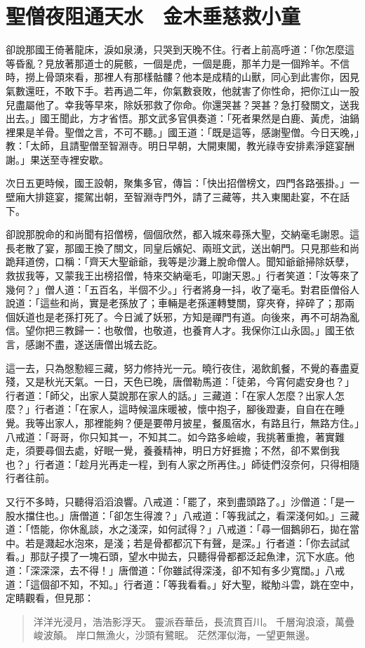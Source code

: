 
\chapter{聖僧夜阻通天水　金木垂慈救小童}

卻說那國王倚著龍床，淚如泉湧，只哭到天晚不住。行者上前高呼道：「你怎麼這等昏亂？見放著那道士的屍骸，一個是虎，一個是鹿，那羊力是一個羚羊。不信時，撈上骨頭來看，那裡人有那樣骷髏？他本是成精的山獸，同心到此害你，因見氣數還旺，不敢下手。若再過二年，你氣數衰敗，他就害了你性命，把你江山一股兒盡屬他了。幸我等早來，除妖邪救了你命。你還哭甚？哭甚？急打發關文，送我出去。」國王聞此，方才省悟。那文武多官俱奏道：「死者果然是白鹿、黃虎，油鍋裡果是羊骨。聖僧之言，不可不聽。」國王道：「既是這等，感謝聖僧。今日天晚，」教：「太師，且請聖僧至智淵寺。明日早朝，大開東閣，教光祿寺安排素淨筵宴酬謝。」果送至寺裡安歇。

次日五更時候，國王設朝，聚集多官，傳旨：「快出招僧榜文，四門各路張掛。」一壁廂大排筵宴，擺駕出朝，至智淵寺門外，請了三藏等，共入東閣赴宴，不在話下。

卻說那脫命的和尚聞有招僧榜，個個欣然，都入城來尋孫大聖，交納毫毛謝恩。這長老散了宴，那國王換了關文，同皇后嬪妃、兩班文武，送出朝門。只見那些和尚跪拜道傍，口稱：「齊天大聖爺爺，我等是沙灘上脫命僧人。聞知爺爺掃除妖孽，救拔我等，又蒙我王出榜招僧，特來交納毫毛，叩謝天恩。」行者笑道：「汝等來了幾何？」僧人道：「五百名，半個不少。」行者將身一抖，收了毫毛。對君臣僧俗人說道：「這些和尚，實是老孫放了；車輛是老孫運轉雙關，穿夾脊，捽碎了；那兩個妖道也是老孫打死了。今日滅了妖邪，方知是禪門有道。向後來，再不可胡為亂信。望你把三教歸一：也敬僧，也敬道，也養育人才。我保你江山永固。」國王依言，感謝不盡，遂送唐僧出城去訖。

這一去，只為慇懃經三藏，努力修持光一元。曉行夜住，渴飲飢餐，不覺的春盡夏殘，又是秋光天氣。一日，天色已晚，唐僧勒馬道：「徒弟，今宵何處安身也？」行者道：「師父，出家人莫說那在家人的話。」三藏道：「在家人怎麼？出家人怎麼？」行者道：「在家人，這時候溫床暖被，懷中抱子，腳後蹬妻，自自在在睡覺。我等出家人，那裡能夠？便是要帶月披星，餐風宿水，有路且行，無路方住。」八戒道：「哥哥，你只知其一，不知其二。如今路多嶮峻，我挑著重擔，著實難走，須要尋個去處，好眠一覺，養養精神，明日方好捱擔；不然，卻不累倒我也？」行者道：「趁月光再走一程，到有人家之所再住。」師徒們沒奈何，只得相隨行者往前。

又行不多時，只聽得滔滔浪響。八戒道：「罷了，來到盡頭路了。」沙僧道：「是一股水擋住也。」唐僧道：「卻怎生得渡？」八戒道：「等我試之，看深淺何如。」三藏道：「悟能，你休亂談，水之淺深，如何試得？」八戒道：「尋一個鵝卵石，拋在當中。若是濺起水泡來，是淺；若是骨都都沉下有聲，是深。」行者道：「你去試試看。」那獃子摸了一塊石頭，望水中拋去，只聽得骨都都泛起魚津，沉下水底。他道：「深深深，去不得！」唐僧道：「你雖試得深淺，卻不知有多少寬闊。」八戒道：「這個卻不知，不知。」行者道：「等我看看。」好大聖，縱觔斗雲，跳在空中，定睛觀看，但見那：
\begin{quote}
洋洋光浸月，浩浩影浮天。
靈派吞華岳，長流貫百川。
千層洶浪滾，萬疊峻波顛。
岸口無漁火，沙頭有鷺眠。
茫然渾似海，一望更無邊。
\end{quote}

